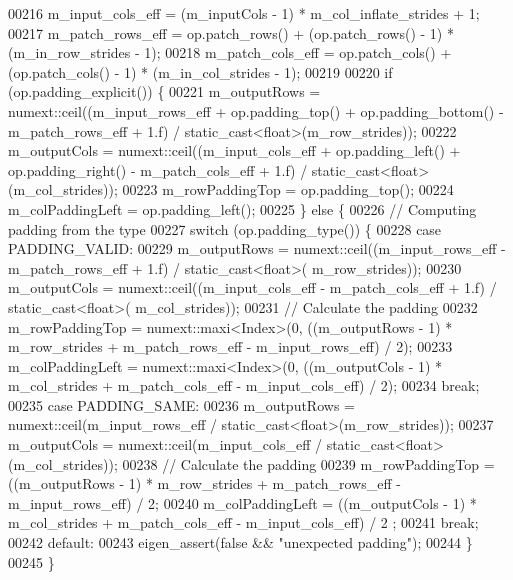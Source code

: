 \begin{DoxyCode}
00216     m\_input\_cols\_eff = (m\_inputCols - 1) * m\_col\_inflate\_strides + 1;
00217     m\_patch\_rows\_eff = op.patch\_rows() + (op.patch\_rows() - 1) * (m\_in\_row\_strides - 1);
00218     m\_patch\_cols\_eff = op.patch\_cols() + (op.patch\_cols() - 1) * (m\_in\_col\_strides - 1);
00219 
00220     \textcolor{keywordflow}{if} (op.padding\_explicit()) \{
00221       m\_outputRows = numext::ceil((m\_input\_rows\_eff + op.padding\_top() + op.padding\_bottom() - 
      m\_patch\_rows\_eff + 1.f) / static\_cast<float>(m\_row\_strides));
00222       m\_outputCols = numext::ceil((m\_input\_cols\_eff + op.padding\_left() + op.padding\_right() - 
      m\_patch\_cols\_eff + 1.f) / static\_cast<float>(m\_col\_strides));
00223       m\_rowPaddingTop = op.padding\_top();
00224       m\_colPaddingLeft = op.padding\_left();
00225     \} \textcolor{keywordflow}{else} \{
00226       \textcolor{comment}{// Computing padding from the type}
00227       \textcolor{keywordflow}{switch} (op.padding\_type()) \{
00228         \textcolor{keywordflow}{case} PADDING\_VALID:
00229           m\_outputRows = numext::ceil((m\_input\_rows\_eff - m\_patch\_rows\_eff + 1.f) / static\_cast<float>(
      m\_row\_strides));
00230           m\_outputCols = numext::ceil((m\_input\_cols\_eff - m\_patch\_cols\_eff + 1.f) / static\_cast<float>(
      m\_col\_strides));
00231           \textcolor{comment}{// Calculate the padding}
00232           m\_rowPaddingTop = numext::maxi<Index>(0, ((m\_outputRows - 1) * m\_row\_strides + m\_patch\_rows\_eff -
       m\_input\_rows\_eff) / 2);
00233           m\_colPaddingLeft = numext::maxi<Index>(0, ((m\_outputCols - 1) * m\_col\_strides + m\_patch\_cols\_eff 
      - m\_input\_cols\_eff) / 2);
00234           \textcolor{keywordflow}{break};
00235         \textcolor{keywordflow}{case} PADDING\_SAME:
00236           m\_outputRows = numext::ceil(m\_input\_rows\_eff / static\_cast<float>(m\_row\_strides));
00237           m\_outputCols = numext::ceil(m\_input\_cols\_eff / static\_cast<float>(m\_col\_strides));
00238           \textcolor{comment}{// Calculate the padding}
00239           m\_rowPaddingTop = ((m\_outputRows - 1) * m\_row\_strides + m\_patch\_rows\_eff - m\_input\_rows\_eff) / 2;
00240           m\_colPaddingLeft = ((m\_outputCols - 1) * m\_col\_strides + m\_patch\_cols\_eff - m\_input\_cols\_eff) / 2
      ;
00241           \textcolor{keywordflow}{break};
00242         \textcolor{keywordflow}{default}:
00243           eigen\_assert(\textcolor{keyword}{false} && \textcolor{stringliteral}{"unexpected padding"});
00244       \}
00245     \}

\end{DoxyCode}
